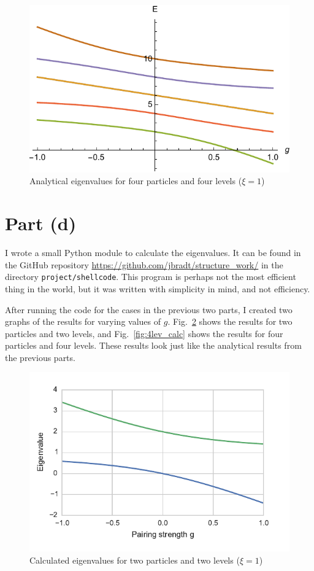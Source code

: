 \documentclass{article}
\begin{document}
	\begin{figure}[p]
		\centering
		\includegraphics{sol4.pdf}
		\caption{Analytical eigenvalues for four particles and four levels ($\xi=1$)}
		\label{fig:4lev_analytical}
	\end{figure}

\section*{Part (d)}
	
	I wrote a small Python module to calculate the eigenvalues. It can be found in the GitHub repository \url{https://github.com/jbradt/structure_work/} in the directory \texttt{project/shellcode}. This program is perhaps not the most efficient thing in the world, but it was written with simplicity in mind, and not efficiency.

	After running the code for the cases in the previous two parts, I created two graphs of the results for varying values of $g$. Fig.~\ref{fig:2lev_calc} shows the results for two particles and two levels, and Fig.~\ref{fig:4lev_calc} shows the results for four particles and four levels. These results look just like the analytical results from the previous parts.

	\begin{figure}[p]
		\centering
		\includegraphics{calc2.pdf}
		\caption{Calculated eigenvalues for two particles and two levels ($\xi=1$)}
		\label{fig:2lev_calc}
	\end{figure}
\end{document}
